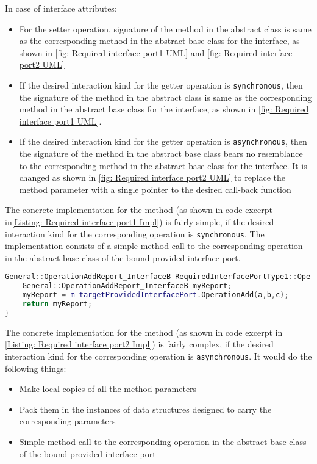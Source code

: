In case of interface attributes:
\begin{itemize}
\item For the setter operation, signature of the method in the abstract class is same as the corresponding method in the abstract base class for the interface, as shown in \cref{fig: Required interface port1 UML} and \cref{fig: Required interface port2 UML}
\item If the desired interaction kind for the getter operation is \texttt{synchronous}, then the signature of the method in the abstract class is same as the corresponding method in the abstract base class for the interface, as shown in \cref{fig: Required interface port1 UML}. 
\item If the desired interaction kind for the getter operation is \texttt{asynchronous}, then the signature of the method in the abstract base class bears no resemblance to the corresponding method in the abstract base class for the interface. It is changed as shown in \cref{fig: Required interface port2 UML} to replace the method parameter with a single pointer to the desired call-back function  
\end{itemize} 

The concrete implementation for the method (as shown in code excerpt in\cref{Listing: Required interface port1 Impl}) is fairly simple, if the desired interaction kind for the corresponding operation is \texttt{synchronous}. The implementation consists of a simple method call to the corresponding operation in the abstract base class of the bound provided interface port.

\begin{Listing}
\begin{lstlisting}[language=C++]
General::OperationAddReport_InterfaceB RequiredInterfacePortType1::OperationAdd (const IntegerType& a,const IntegerType& b,IntegerType& c) {
	General::OperationAddReport_InterfaceB myReport;
	myReport = m_targetProvidedInterfacePort.OperationAdd(a,b,c);
	return myReport;
}
\end{lstlisting}
\caption{Code excerpt from the generated code for requesting service \texttt{OperationAdd} in \texttt{Required\allowbreak InterfacePort\allowbreak Type1}}
\label{Listing: Required interface port1 Impl}
\end{Listing}

The concrete implementation for the method (as shown in code excerpt in \cref{Listing: Required interface port2 Impl}) is fairly complex, if the desired interaction kind for the corresponding operation is \texttt{asynchronous}. It would do the following things: 
\begin{itemize}
\item Make local copies of all the method parameters
\item Pack them in the instances of data structures designed to carry the corresponding parameters
\item Simple method call to the corresponding operation in the abstract base class of the bound provided interface port
\end{itemize}

